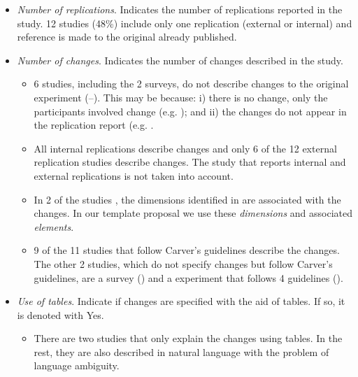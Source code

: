 \begin{itemize}
	
	
	\item \emph{Number of replications}. Indicates the number of replications reported in the study. 12 studies (48\%)  include only one replication (external or internal) and reference is made to the original already published.
	\\
   \item \emph{Number of changes}. Indicates the number of changes described in the study.
   \begin{itemize}
        \item 6 studies, including the 2 surveys, do not describe changes to the original experiment (--). This may be because: i) there is no change, only the participants involved change (e.g. \cite{fernandez2016does}); and ii) the changes do not appear in the replication report 	(e.g. \cite{santos2019comparing}.
   
    \item All internal replications describe changes and only 6 of the 12 external replication studies describe changes. The study that reports internal and external replications is not taken into account.
    
     \item In 2 of the studies \cite{de2017influence,fucci2016external}, the dimensions identified in \cite{gomez2014understanding} are associated with the changes. In our template proposal we use these \emph{dimensions} and associated \emph{elements}.
 
     \item 9 of the 11 studies that follow Carver's guidelines describe the changes. The other 2 studies, which do not specify changes but follow Carver's guidelines, are a survey (\cite{nielebock2019commenting}) and a experiment that follows 4 guidelines (\cite{fernandez2016does}).
    \\
    \end{itemize}

   
     \item \emph{Use of tables}. Indicate if changes are specified with the aid of tables. If so, it is denoted with Yes.
   
    \begin{itemize}
        \item There are two studies \cite{reimanis2014replication,assar2016using} that only explain the changes using tables. In the rest, they are also described in natural language with the problem of language ambiguity.
   

\end{itemize}
\end{itemize}
